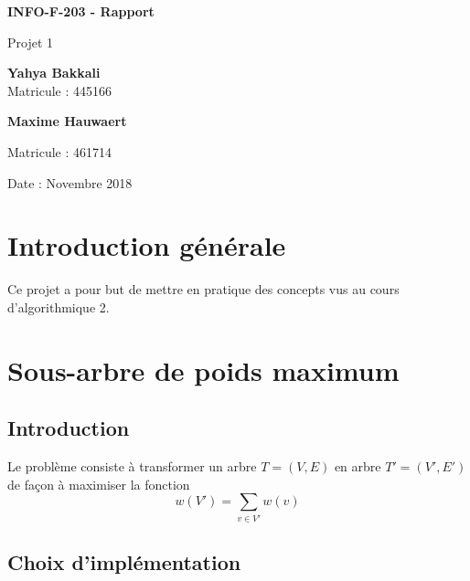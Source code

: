 \documentclass{article}
\begin{document}
\begin{titlepage}
    \begin{center}
        \vspace*{1cm}
        
        \Huge
        \textbf{INFO-F-203 - Rapport}
        
        \vspace{0.5cm}
        \LARGE
        Projet 1
        
        \vspace{1.5cm}
        
        \textbf{Yahya Bakkali\\}
        \Large
        Matricule : 445166\\
        
		\vspace{0.5cm}        
        
        \LARGE
        \textbf{Maxime Hauwaert\\}
        
		\Large        
        Matricule : 461714\\
        
        \vspace{0.8cm}

        Date : Novembre 2018
        
    \end{center}
\end{titlepage}

\setcounter{tocdepth}{3}
\tableofcontents
\newpage
\Large
	
\section{Introduction générale}
Ce projet a pour but de mettre en pratique des concepts vus au cours d’algorithmique 2.

\section{Sous-arbre de poids maximum}
	\subsection{Introduction}
		Le problème consiste à transformer un arbre $T=(V,E)$ en arbre ${T'}=({V'},{E'})$ de façon à maximiser la fonction
		$$w({V'})=\sum_{v\in{V'}} w(v)$$

	\subsection{Choix d'implémentation}
	
\end{document}
